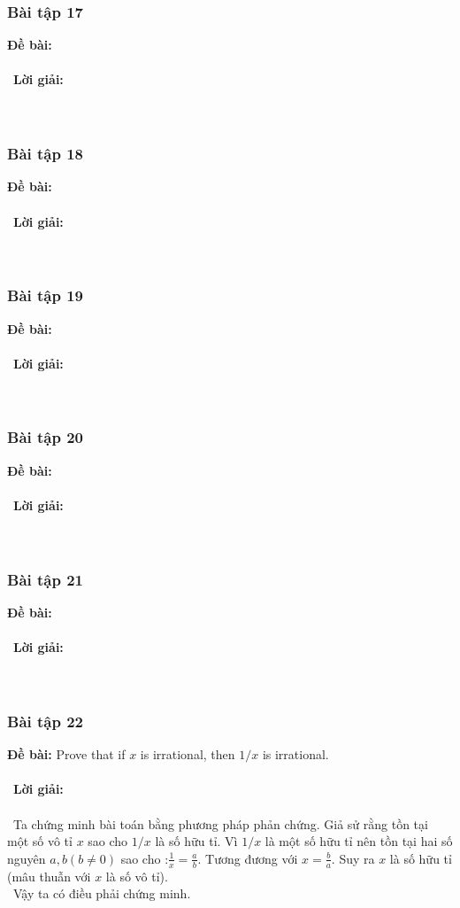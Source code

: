 \documentclass[a4paper]{article}
\begin{document}
\subsubsection{Bài tập 17}
\textbf{Đề bài:} 
\\\ \\\
\textbf{Lời giải:} \\\ \\\
\clearpage
\subsubsection{Bài tập 18}
\textbf{Đề bài:} 
\\\ \\\
\textbf{Lời giải:} \\\ \\\
\clearpage
\subsubsection{Bài tập 19}
\textbf{Đề bài:} 
\\\ \\\
\textbf{Lời giải:} \\\ \\\
\clearpage
\subsubsection{Bài tập 20}
\textbf{Đề bài:} 
\\\ \\\
\textbf{Lời giải:} \\\ \\\
\clearpage
\subsubsection{Bài tập 21}
\textbf{Đề bài:} 
\\\ \\\
\textbf{Lời giải:} \\\ \\\
\clearpage
\subsubsection{Bài tập 22}
\textbf{Đề bài: }Prove that if $x$ is irrational, then $1/x$ is irrational. \\\ \\\
\textbf{Lời giải:} \\\ \\\
Ta chứng minh bài toán bằng phương pháp phản chứng. Giả sử rằng tồn tại một số vô tỉ $x$ sao cho $1/x$ là số hữu tỉ. Vì $1/x$ là một số hữu tỉ nên tồn tại hai số nguyên $a,b (b \neq 0)$ sao cho :$\frac{1}{x} = \frac{a}{b}.$ Tương đương với $x = \frac{b}{a}$. Suy ra $x$ là số hữu tỉ (mâu thuẫn với $x$ là số vô tỉ). \\\
Vậy ta có điều phải chứng minh.
\clearpage
\end{document}

